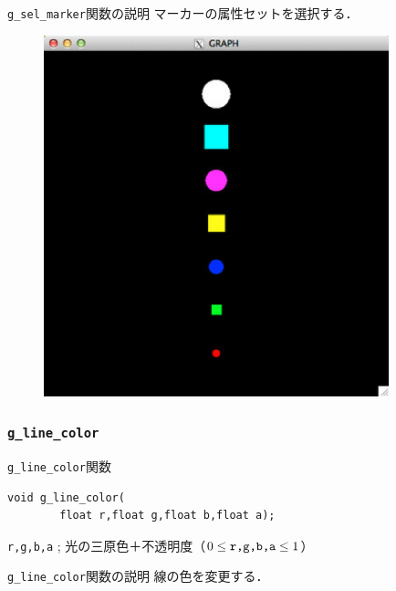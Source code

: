 \documentclass[platex,a4paper,12pt]{jsarticle}%
\begin{document}
\begin{itembox}[l]{\texttt{g\_sel\_marker}関数の説明}
マーカーの属性セットを選択する．
\end{itembox}

\begin{figure}[htb]
	\includegraphics[width=100mm]{./Figures/eps/Canvas_g_marker.eps}
\end{figure}


\clearpage
\subsubsection{\texttt{g\_line\_color}}

\begin{itembox}[l]{\texttt{g\_line\_color}関数}
\begin{verbatim}
void g_line_color(
        float r,float g,float b,float a);
\end{verbatim}
\verb|r,g,b,a| ; 光の三原色＋不透明度（$0\leq \verb|r,g,b,a| \leq 1$）\\
\end{itembox}

\begin{itembox}[l]{\texttt{g\_line\_color}関数の説明}
線の色を変更する．
\end{itembox}
\end{document}
